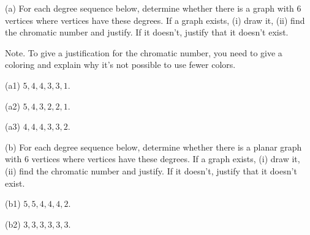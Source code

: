 \documentclass{article}
\begin{document}
\newpage
\vskip 0.25in

\begin{problem}
(a) For each degree sequence below, determine whether there is a graph with $6$ vertices where vertices have
these degrees. If a graph exists, (i) draw it, (ii) find the chromatic number and justify. If it doesn't, justify that it doesn't exist.

\noindent Note. To give a justification for the chromatic number, you need to give a coloring and explain why it's not possible to use fewer colors.
%
%
\begin{description}\setlength{\itemsep}{-3pt}
	\item{(a1)} $5, 4, 4, 3, 3, 1$. 
	\item{(a2)} $5, 4, 3, 2, 2, 1$.
	\item{(a3)} $4, 4, 4, 3, 3, 2$.
\end{description}

\noindent (b) For each degree sequence below, determine whether there is a planar graph with $6$ vertices where vertices have
these degrees. If a graph exists, (i) draw it, (ii) find the chromatic number and justify. If it doesn't, justify that it doesn't exist.

% 
%
\begin{description}\setlength{\itemsep}{-3pt}
	\item{(b1)} $5, 5, 4, 4, 4, 2$.
	\item{(b2)} $3, 3, 3, 3, 3, 3$.
\end{description}
\end{problem}
\end{document}

